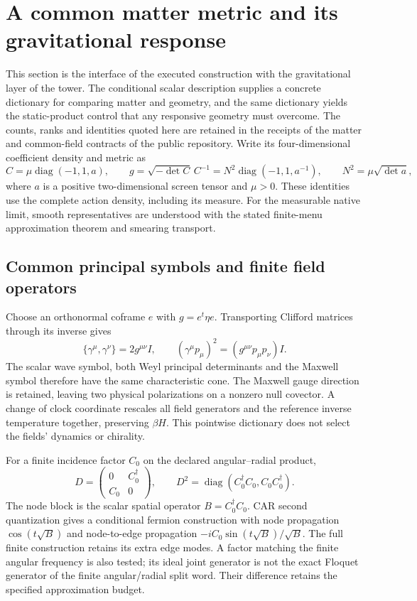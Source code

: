 \section{A common matter metric and its gravitational response}
\label{sec:common-matter-metric-response}

This section is the interface of the executed construction with the
gravitational layer of the tower. The conditional scalar description supplies
a concrete dictionary for comparing matter and geometry, and the same
dictionary yields the static-product control that any responsive geometry
must overcome. The counts, ranks and identities quoted here are retained in
the receipts of the matter and common-field contracts of the public
repository. Write its four-dimensional coefficient density
and metric as
\[
 C=\mu\operatorname{diag}(-1,1,a),\qquad
 g=\sqrt{-\det C}\,C^{-1}
   =N^2\operatorname{diag}(-1,1,a^{-1}),\qquad
 N^2=\mu\sqrt{\det a},
\]
where \(a\) is a positive two-dimensional screen tensor and \(\mu>0\).
These identities use the complete action density, including its measure.
For the measurable native limit, smooth representatives are understood with
the stated finite-menu approximation theorem and smearing transport.

\subsection{Common principal symbols and finite field operators}

Choose an orthonormal coframe \(e\) with \(g=e^t\eta e\). Transporting
Clifford matrices through its inverse gives
\[
 \{\gamma^\mu,\gamma^\nu\}=2g^{\mu\nu}I,\qquad
 (\gamma^\mu p_\mu)^2=(g^{\mu\nu}p_\mu p_\nu)I.
\]
The scalar wave symbol, both Weyl principal determinants and the Maxwell
symbol therefore have the same characteristic cone. The Maxwell gauge
direction is retained, leaving two physical polarizations on a nonzero
null covector. A change of clock coordinate rescales all field generators
and the reference inverse temperature together, preserving \(\beta H\).
This pointwise dictionary does not select the fields' dynamics or chirality.

For a finite incidence factor \(C_0\) on the declared angular--radial product,
\[
 D=\begin{pmatrix}0&C_0^\dagger\\C_0&0\end{pmatrix},\qquad
 D^2=\operatorname{diag}(C_0^\dagger C_0,C_0C_0^\dagger).
\]
The node block is the scalar spatial operator \(B=C_0^\dagger C_0\).
CAR second quantization gives a conditional fermion construction with node
propagation \(\cos(t\sqrt B)\) and node-to-edge propagation
\(-iC_0\sin(t\sqrt B)/\sqrt B\). The full finite construction retains its
extra edge modes. A factor matching the finite angular frequency is also
tested; its ideal joint generator is not the exact Floquet generator of
the finite angular/radial split word. Their difference retains the
specified approximation budget.

